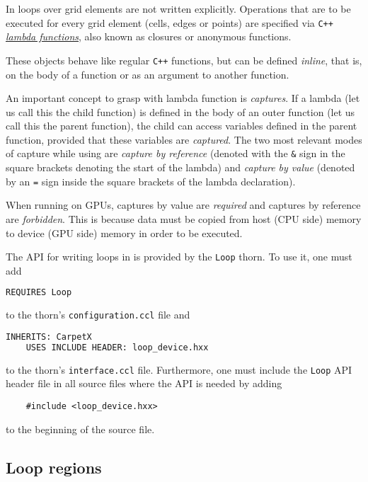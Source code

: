 In \CarpetX\space loops over grid elements are not written explicitly. Operations that are to be executed for every grid element (cells, edges or points) are specified via \texttt{C++} \href{https://en.cppreference.com/w/cpp/language/lambda}{\textit{lambda functions}}, also known as closures or anonymous functions.

These objects behave like regular \texttt{C++} functions, but can be defined \textit{inline}, that is, on the body of a function or as an argument to another function.

An important concept to grasp with lambda function is \textit{captures}. If a lambda (let us call this the child function) is defined in the body of an outer function (let us call this the parent function), the child can access variables defined in the parent function, provided that these variables are \textit{captured}. The two most relevant modes of capture while using \CarpetX\space are \textit{capture by reference} (denoted with the \texttt{\&} sign in the square brackets denoting the start of the lambda) and \textit{capture by value} (denoted by an \texttt{=} sign inside the square brackets of the lambda declaration).

When running on GPUs, captures by value are \textit{required} and captures by reference are \textit{forbidden}. This is because data must be copied from host (CPU side) memory to device (GPU side) memory in order to be executed.

The API for writing loops in \CarpetX\space is provided by the \texttt{Loop} thorn. To use it, one must add
%
\begin{lstlisting}[language=Bash]
    REQUIRES Loop
\end{lstlisting}
%
to the thorn's \texttt{configuration.ccl} file and
%
\begin{lstlisting}[language=Bash]
    INHERITS: CarpetX   
    USES INCLUDE HEADER: loop_device.hxx
\end{lstlisting}
%
to the thorn's \texttt{interface.ccl} file. Furthermore, one must include the \texttt{Loop} API header file in all source files where the API is needed by adding
%
\begin{lstlisting}
    #include <loop_device.hxx>
\end{lstlisting}
%
to the beginning of the source file.

\subsection{Loop regions}
\label{sec:loop_regions}

